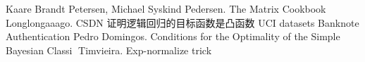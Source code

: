 \begin{thebibliography}{99}
    Kaare Brandt Petersen, Michael Syskind Pedersen. The Matrix Cookbook
    Longlongaaago. CSDN 证明逻辑回归的目标函数是凸函数
    UCI datasets Banknote Authentication
    Pedro Domingos. Conditions for the Optimality of the Simple Bayesian Classi
    Timvieira. Exp-normalize trick
\end{thebibliography}

